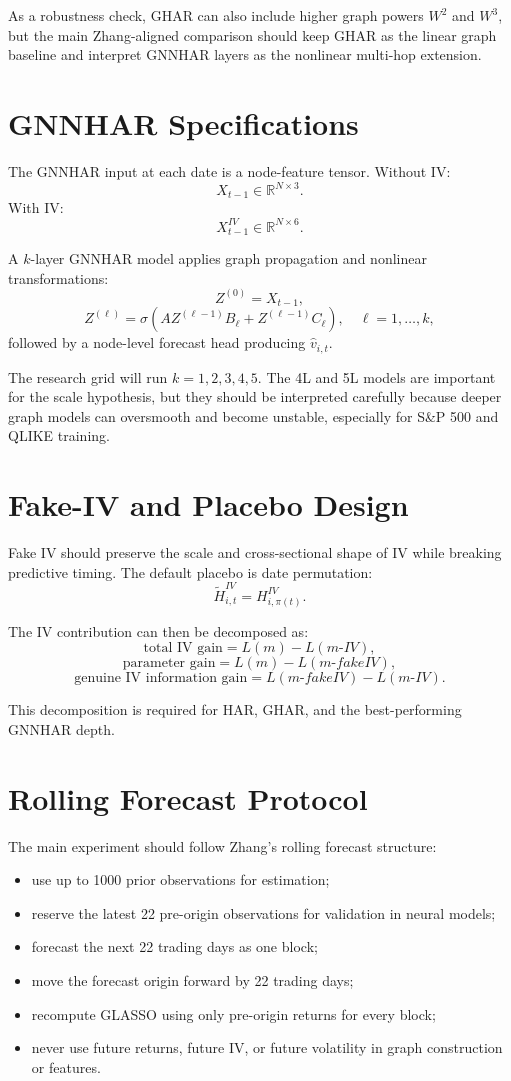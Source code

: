 \documentclass[11pt,a4paper]{article}
\begin{document}
As a robustness check, GHAR can also include higher graph powers \(W^2\) and \(W^3\), but the main Zhang-aligned comparison should keep GHAR as the linear graph baseline and interpret GNNHAR layers as the nonlinear multi-hop extension.

\section{GNNHAR Specifications}

The GNNHAR input at each date is a node-feature tensor. Without IV:
\[
X_{t-1}\in\mathbb{R}^{N\times 3}.
\]
With IV:
\[
X^{IV}_{t-1}\in\mathbb{R}^{N\times 6}.
\]

A \(k\)-layer GNNHAR model applies graph propagation and nonlinear transformations:
\[
Z^{(0)}=X_{t-1},
\]
\[
Z^{(\ell)}=\sigma\left(A Z^{(\ell-1)} B_{\ell}+Z^{(\ell-1)} C_{\ell}\right),
\quad \ell=1,\ldots,k,
\]
followed by a node-level forecast head producing \(\widehat{v}_{i,t}\).

The research grid will run \(k=1,2,3,4,5\). The 4L and 5L models are important for the scale hypothesis, but they should be interpreted carefully because deeper graph models can oversmooth and become unstable, especially for S\&P 500 and QLIKE training.

\section{Fake-IV and Placebo Design}

Fake IV should preserve the scale and cross-sectional shape of IV while breaking predictive timing. The default placebo is date permutation:
\[
\widetilde{H}^{IV}_{i,t}=H^{IV}_{i,\pi(t)}.
\]

The IV contribution can then be decomposed as:
\[
\text{total IV gain}=L(m)-L(m\text{-}IV),
\]
\[
\text{parameter gain}=L(m)-L(m\text{-}fakeIV),
\]
\[
\text{genuine IV information gain}=L(m\text{-}fakeIV)-L(m\text{-}IV).
\]

This decomposition is required for HAR, GHAR, and the best-performing GNNHAR depth.

\section{Rolling Forecast Protocol}

The main experiment should follow Zhang's rolling forecast structure:
\begin{itemize}[leftmargin=*]
  \item use up to 1000 prior observations for estimation;
  \item reserve the latest 22 pre-origin observations for validation in neural models;
  \item forecast the next 22 trading days as one block;
  \item move the forecast origin forward by 22 trading days;
  \item recompute GLASSO using only pre-origin returns for every block;
  \item never use future returns, future IV, or future volatility in graph construction or features.
\end{itemize}
\end{document}
